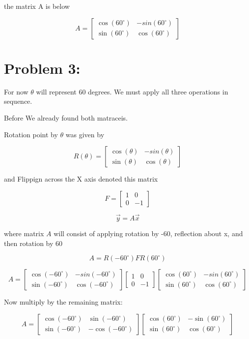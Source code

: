 \documentclass{ximera}
\begin{document}
\begin{enumerate}
\noindent the matrix A is below

\[
\boxed{
A = \begin{bmatrix}
    \cos(60^{\circ}) & -sin(60^{\circ}) \\
    \sin(60^{\circ}) & \cos(60^{\circ})
\end{bmatrix}}
\]

\section*{Problem 3:}


\noindent For now $\theta$ will represent 60 degrees. We must apply all three operations in sequence.

\noindent Before We already found both matraceis.

\noindent Rotation point by $\theta$ was given by

\[
R(\theta)=\begin{bmatrix}
    \cos(\theta) & -sin(\theta) \\
    \sin(\theta) & \cos(\theta)
\end{bmatrix}
\]

\noindent and Flippign across the X axis denoted this matrix

\[
F=\begin{bmatrix}
    1 & 0 \\
    0 & -1
\end{bmatrix}
\]

\[\vec{y} = A\vec{x}\]

\noindent where matrix $A$ will consist of applying rotation by -60, reflection about x, and then rotation by 60

\[
A = R(-60^{\circ})FR(60^{\circ})
\]

\[A = \begin{bmatrix}
    \cos(-60^{\circ}) & -sin(-60^{\circ}) \\
    \sin(-60^{\circ}) & \cos(-60^{\circ})
\end{bmatrix}
\begin{bmatrix}
    1 & 0 \\
    0 & -1
\end{bmatrix}
\begin{bmatrix}
    \cos(60^{\circ}) & -sin(60^{\circ}) \\
    \sin(60^{\circ}) & \cos(60^{\circ})
\end{bmatrix}\] 

\noindent Now multiply by the remaining matrix:

\[
A =
\begin{bmatrix}
\cos(-60^\circ) & \sin(-60^\circ) \\
\sin(-60^\circ) & -\cos(-60^\circ)
\end{bmatrix}
\begin{bmatrix}
\cos(60^\circ) & -\sin(60^\circ) \\
\sin(60^\circ) & \cos(60^\circ)
\end{bmatrix}
\]


\end{enumerate}
\end{document}
